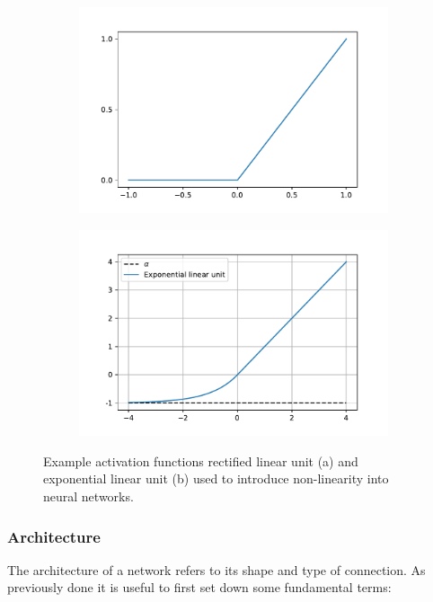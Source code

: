 			\begin{figure}
				\begin{subfigure}{.49\textwidth}
					\centering
					\includegraphics[width=\textwidth]{images/ReLU.pdf}
					\label{Fig:ReLU}
				\end{subfigure}
				\begin{subfigure}{.49\textwidth}
					\centering
					\includegraphics[width=\textwidth]{images/Elu.pdf}
					\label{Fig:ELU}
				\end{subfigure}
				\caption{Example activation functions rectified linear unit (a) and  exponential linear unit (b) used to introduce non-linearity into neural networks.}
				\label{Fig:ReLUELU}
			\end{figure}
		
		\subsubsection{Architecture}
			The architecture of a network refers to its shape and type of connection. As previously done it is useful to first set down some fundamental terms:
